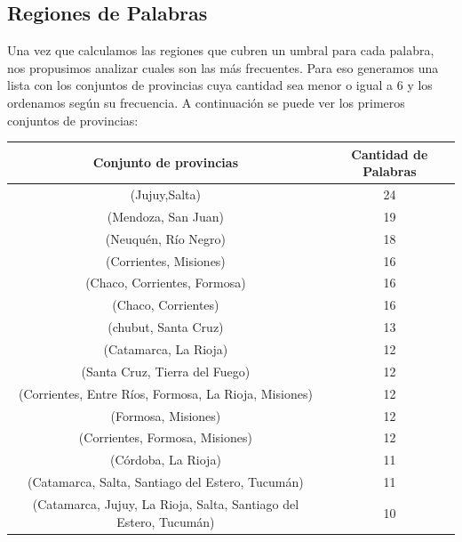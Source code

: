 \subsection{Regiones de Palabras} %
\label{sub:regiones_de_palabras}

Una vez que calculamos las regiones que cubren un umbral para cada palabra, nos propusimos analizar cuales son las más frecuentes. Para eso generamos una lista con los conjuntos de provincias cuya cantidad sea menor o igual a 6 y los ordenamos según su frecuencia. A continuación se puede ver los primeros conjuntos de provincias:

\begin{table}[]
\centering
\label{tab:regiones}
\begin{tabular}{|c|c|}
\hline
Conjunto de provincias                                 & Cantidad de Palabras  \\ \hline
(Jujuy,Salta)                                          & 24          \\
(Mendoza, San Juan)                                    & 19          \\
(Neuquén, Río Negro)                                   & 18          \\
(Corrientes, Misiones)                                 & 16          \\
(Chaco, Corrientes, Formosa)                           & 16          \\
(Chaco, Corrientes)                                    & 16          \\
(chubut, Santa Cruz)                                   & 13          \\
(Catamarca, La Rioja)                                  & 12          \\
(Santa Cruz, Tierra del Fuego)                         & 12          \\
(Corrientes, Entre Ríos, Formosa, La Rioja, Misiones)  & 12          \\  %
(Formosa, Misiones)                                    & 12          \\
(Corrientes, Formosa, Misiones)                        & 12          \\
(Córdoba, La Rioja)                                    & 11          \\
(Catamarca, Salta, Santiago del Estero, Tucumán)       & 11          \\
(Catamarca, Jujuy, La Rioja, Salta, Santiago del Estero, Tucumán) & 10          \\

\end{tabular}
\end{table}
